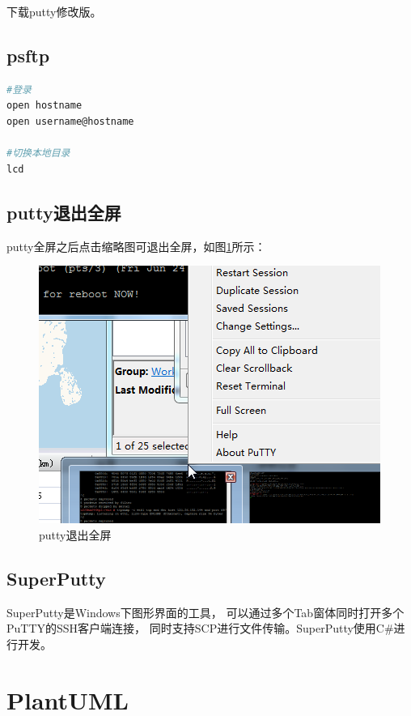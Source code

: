 \documentclass{book}
\begin{document}
下载putty修改版。

\subsection{psftp}

\begin{lstlisting}[language=Bash]
#登录
open hostname
open username@hostname

#切换本地目录
lcd
\end{lstlisting}

\subsection{putty退出全屏}

putty全屏之后点击缩略图可退出全屏，如图\ref{fig:puttyExistsFullScreen}所示：

\begin{figure}[htbp]
	\centering
	\includegraphics[scale=0.6]{puttyExistsFullScreen.png}
	\caption{putty退出全屏}
	\label{fig:puttyExistsFullScreen}
\end{figure}

\subsection{SuperPutty}

SuperPutty是Windows下图形界面的工具，
可以通过多个Tab窗体同时打开多个PuTTY的SSH客户端连接，
同时支持SCP进行文件传输。SuperPutty使用C\#进行开发。

\section{PlantUML}
\end{document}
